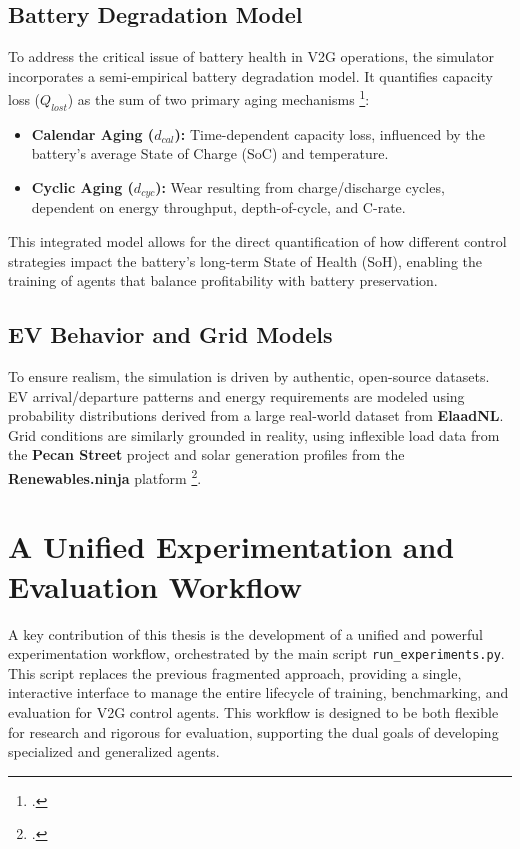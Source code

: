 \subsection{Battery Degradation Model}
To address the critical issue of battery health in V2G operations, the simulator incorporates a semi-empirical battery degradation model. It quantifies capacity loss ($Q_{lost}$) as the sum of two primary aging mechanisms \footcite{orfanoudakis2024ev2gym}:
\begin{itemize}
    \item \textbf{Calendar Aging ($d_{cal}$):} Time-dependent capacity loss, influenced by the battery's average State of Charge (SoC) and temperature.
    \item \textbf{Cyclic Aging ($d_{cyc}$):} Wear resulting from charge/discharge cycles, dependent on energy throughput, depth-of-cycle, and C-rate.
\end{itemize}
This integrated model allows for the direct quantification of how different control strategies impact the battery's long-term State of Health (SoH), enabling the training of agents that balance profitability with battery preservation.

\subsection{EV Behavior and Grid Models}
To ensure realism, the simulation is driven by authentic, open-source datasets. EV arrival/departure patterns and energy requirements are modeled using probability distributions derived from a large real-world dataset from \textbf{ElaadNL}. Grid conditions are similarly grounded in reality, using inflexible load data from the \textbf{Pecan Street} project and solar generation profiles from the \textbf{Renewables.ninja} platform \footcite{orfanoudakis2024ev2gym}.

\section{A Unified Experimentation and Evaluation Workflow}
A key contribution of this thesis is the development of a unified and powerful experimentation workflow, orchestrated by the main script \texttt{run\_experiments.py}. This script replaces the previous fragmented approach, providing a single, interactive interface to manage the entire lifecycle of training, benchmarking, and evaluation for V2G control agents. This workflow is designed to be both flexible for research and rigorous for evaluation, supporting the dual goals of developing specialized and generalized agents.

